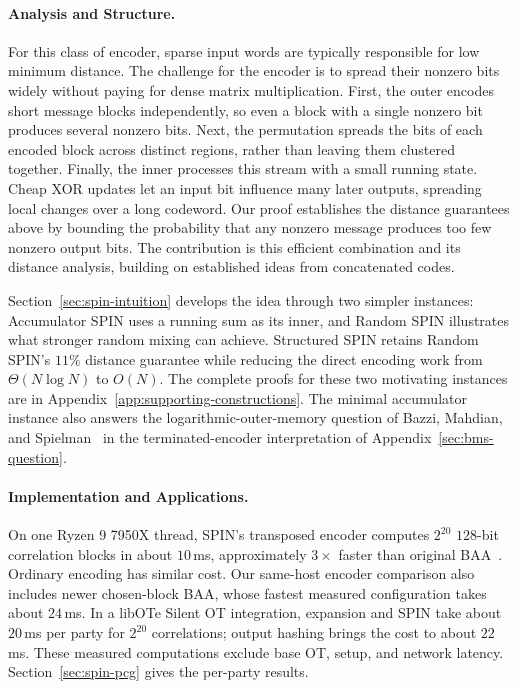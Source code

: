 \paragraph{Analysis and Structure.}
For this class of encoder, sparse input words are typically responsible
for low minimum distance. The challenge for the encoder is to spread their
nonzero bits widely without paying for dense matrix multiplication.
First, the outer encodes short message blocks independently, so even a block
with a single nonzero bit produces several nonzero bits.
Next, the permutation spreads the bits of each encoded block across distinct
regions, rather than leaving them clustered together.
Finally, the inner processes this stream with a small running state.
Cheap XOR updates let an input bit influence many later outputs, spreading
local changes over a long codeword.
Our proof establishes the distance guarantees above by
bounding the probability that any nonzero message produces too few nonzero
output bits. The contribution is this efficient combination and its distance
analysis, building on established ideas from concatenated codes.

Section~\ref{sec:spin-intuition} develops the idea through two simpler
instances: Accumulator SPIN uses a running sum as its inner, and Random SPIN
illustrates what stronger random mixing can achieve. Structured SPIN
retains Random SPIN's $11\%$ distance guarantee while reducing the direct
encoding work from $\Theta(N\log N)$ to $O(N)$.
The complete proofs for these two motivating instances are in
Appendix~\ref{app:supporting-constructions}.
The minimal accumulator instance also answers the logarithmic-outer-memory
question of Bazzi, Mahdian, and Spielman~\cite{bms09} in the
terminated-encoder interpretation of Appendix~\ref{sec:bms-question}.

\paragraph{Implementation and Applications.}
On one Ryzen 9 7950X thread, SPIN's transposed encoder computes
$2^{20}$ $128$-bit correlation blocks in about $10$\,ms, approximately
$3\times$ faster than original BAA~\cite{KolesnikovEtAl2026BA}.
Ordinary encoding has similar cost.
Our same-host encoder comparison also includes newer chosen-block BAA,
whose fastest measured configuration takes about $24$\,ms.
In a libOTe Silent OT integration, expansion and SPIN take about $20$\,ms
per party for $2^{20}$ correlations; output hashing brings the cost to
about $22$\,ms. These measured computations exclude base OT, setup, and
network latency. Section~\ref{sec:spin-pcg} gives the per-party results.

